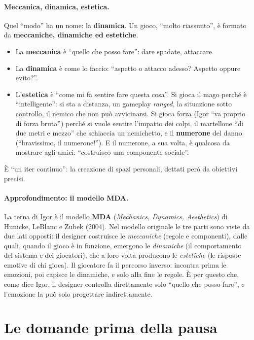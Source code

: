 \paragraph{Meccanica, dinamica, estetica.} Quel ``modo'' ha un nome: la
\textbf{dinamica}. Un gioco, ``molto riassunto'', è formato da \textbf{meccaniche,
dinamiche ed estetiche}.
\begin{itemize}
  \item La \textbf{meccanica} è ``quello che posso fare'': dare spadate, attaccare.
  \item La \textbf{dinamica} è come lo faccio: ``aspetto o attacco adesso? Aspetto
        oppure evito?''.
  \item L'\textbf{estetica} è ``come mi fa sentire fare questa cosa''. Si gioca il mago
        perché è ``intelligente'': si sta a distanza, un gameplay \emph{ranged}, la
        situazione sotto controllo, il nemico che non può avvicinarsi. Si gioca forza
        (Igor ``va proprio di forza bruta'') perché si vuole sentire l'impatto dei
        colpi, il martellone ``di due metri e mezzo'' che schiaccia un nemichetto, e il
        \textbf{numerone} del danno (``bravissimo, il numerone!''). E il numerone, a
        sua volta, è qualcosa da mostrare agli amici: ``costruisco una componente
        sociale''.
\end{itemize}
È ``un iter continuo'': la creazione di spazi personali, dettati però da obiettivi
precisi.

\paragraph{Approfondimento: il modello MDA.} La terna di Igor è il modello \textbf{MDA}
(\emph{Mechanics, Dynamics, Aesthetics}) di Hunicke, LeBlanc e Zubek (2004). Nel
modello originale le tre parti sono viste da due lati opposti: il designer costruisce
le \emph{meccaniche} (regole e componenti), dalle quali, quando il gioco è in funzione,
emergono le \emph{dinamiche} (il comportamento del sistema e dei giocatori), che a loro
volta producono le \emph{estetiche} (le risposte emotive di chi gioca). Il giocatore
fa il percorso inverso: incontra prima le emozioni, poi capisce le dinamiche, e solo
alla fine le regole. È per questo che, come dice Igor, il designer controlla
direttamente solo ``quello che posso fare'', e l'emozione la può solo progettare
indirettamente.

\section{Le domande prima della pausa}
\label{ue1:sec:domande}

